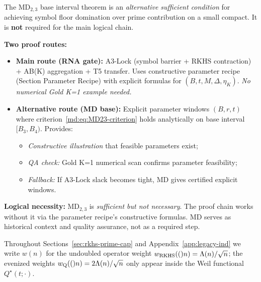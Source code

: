 
\begin{remark}\label{rem:md-optional}
The MD$_{2,3}$ base interval theorem is an \emph{alternative sufficient condition} for achieving symbol floor domination over prime contribution on a small compact. It is \textbf{not} required for the main logical chain.

\textbf{Two proof routes:}
\begin{itemize}
  \item \textbf{Main route (RNA gate):} A3-Lock (symbol barrier + RKHS contraction) + AB(K) aggregation + T5 transfer. Uses constructive parameter recipe (Section Parameter Recipe) with explicit formulas for $(B,t,M,\Delta,\eta_K)$. \emph{No numerical Gold K=1 example needed.}
  \item \textbf{Alternative route (MD base):} Explicit parameter windows $(B,r,t)$ where criterion~\eqref{md:eq:MD23-criterion} holds analytically on base interval $[B_3,B_4)$. Provides:
  \begin{itemize}
    \item \emph{Constructive illustration} that feasible parameters exist;
    \item \emph{QA check:} Gold K=1 numerical scan confirms parameter feasibility;
    \item \emph{Fallback:} If A3-Lock slack becomes tight, MD gives certified explicit windows.
  \end{itemize}
\end{itemize}

\textbf{Logical necessity:} MD$_{2,3}$ is \emph{sufficient but not necessary}. The proof chain works without it via the parameter recipe's constructive formulas. MD serves as historical context and quality assurance, not as a required step.
\end{remark}

\begin{remark}
Throughout Sections~\ref{sec:rkhs-prime-cap} and Appendix~\ref{app:legacy-ind} we write $w(n)$ for the undoubled operator weight $w_{\mathrm{RKHS}}(()n)=\Lambda(n)/\sqrt n$; the evenized weights $w_{\mathrm{Q}}(()n)=2\Lambda(n)/\sqrt n$ only appear inside the Weil functional $Q^\star(t;\cdot)$.
\end{remark}

